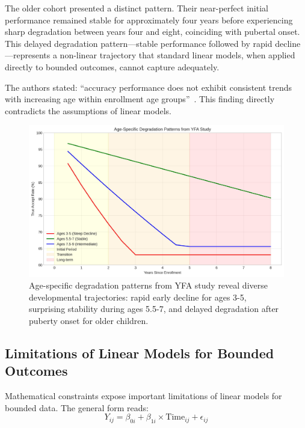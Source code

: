 \documentclass[10pt,journal,compsoc]{IEEEtran}
\begin{document}
The older cohort presented a distinct pattern. Their near-perfect initial performance remained stable for approximately four years before experiencing sharp degradation between years four and eight, coinciding with pubertal onset. This delayed degradation pattern---stable performance followed by rapid decline---represents a non-linear trajectory that standard linear models, when applied directly to bounded outcomes, cannot capture adequately.

The authors stated: ``accuracy performance does not exhibit consistent trends with increasing age within enrollment age groups''~\cite{bahmani2023}. This finding directly contradicts the assumptions of linear models.

\begin{figure}[htbp]
\centering
\includegraphics[width=\columnwidth]{age_patterns.pdf}
\caption{Age-specific degradation patterns from YFA study reveal diverse developmental trajectories: rapid early decline for ages 3-5, surprising stability during ages 5.5-7, and delayed degradation after puberty onset for older children.}
\label{fig:age-patterns}
\end{figure}

\subsection{Limitations of Linear Models for Bounded Outcomes}

Mathematical constraints expose important limitations of linear models for bounded data. The general form reads:
\begin{equation}
Y_{ij} = \beta_{0i} + \beta_{1i} \times \text{Time}_{ij} + \epsilon_{ij}
\label{eq:linear_model}
\end{equation}
\end{document}

